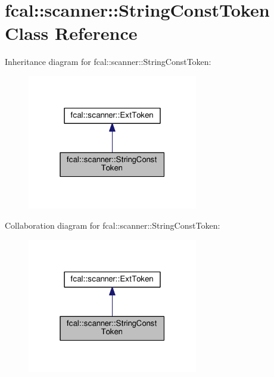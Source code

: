 \hypertarget{classfcal_1_1scanner_1_1StringConstToken}{}\section{fcal\+:\+:scanner\+:\+:String\+Const\+Token Class Reference}
\label{classfcal_1_1scanner_1_1StringConstToken}


Inheritance diagram for fcal\+:\+:scanner\+:\+:String\+Const\+Token\+:\nopagebreak
\begin{figure}[H]
\begin{center}
\leavevmode
\includegraphics[width=211pt]{classfcal_1_1scanner_1_1StringConstToken__inherit__graph}
\end{center}
\end{figure}


Collaboration diagram for fcal\+:\+:scanner\+:\+:String\+Const\+Token\+:\nopagebreak
\begin{figure}[H]
\begin{center}
\leavevmode
\includegraphics[width=211pt]{classfcal_1_1scanner_1_1StringConstToken__coll__graph}
\end{center}
\end{figure}
